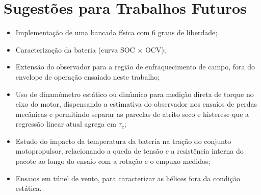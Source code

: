 \section{Sugestões para Trabalhos Futuros}
\begin{itemize}
    \item Implementação de uma bancada física com 6 graus de liberdade;
    \item Caracterização da bateria (curva SOC $\times$ OCV);
    \item Extensão do observador para a região de enfraquecimento de campo,
    fora do envelope de operação ensaiado neste trabalho;
    \item Uso de dinamômetro estático ou dinâmico para medição direta de torque
    no eixo do motor, dispensando a estimativa do observador nos ensaios de
    perdas mecânicas e permitindo separar as parcelas de atrito seco e histerese
    que a regressão linear atual agrega em $\tau_c$;
    \item Estudo do impacto da temperatura da bateria na tração do conjunto
    motopropulsor, relacionando a queda de tensão e a resistência interna do
    pacote ao longo do ensaio com a rotação e o empuxo medidos;
    \item Ensaios em túnel de vento, para caracterizar as hélices fora da
    condição estática.
\end{itemize}
